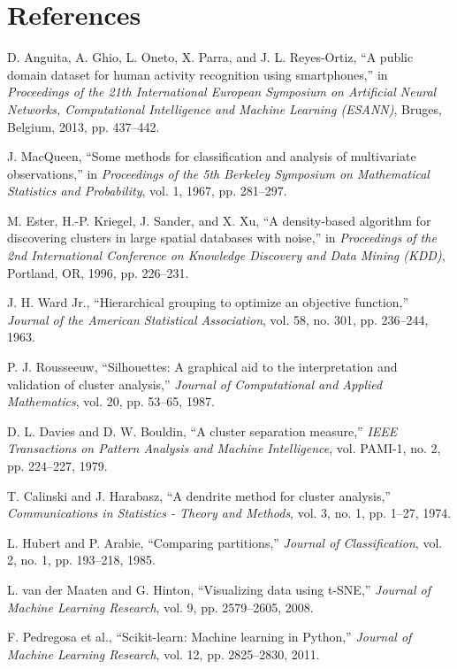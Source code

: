 \documentclass[12pt,a4paper]{article}
\begin{document}
\section{References}
\begin{enumerate}[label={[\arabic*]},noitemsep]
    \item D. Anguita, A. Ghio, L. Oneto, X. Parra, and J. L. Reyes-Ortiz, ``A public domain dataset for human activity recognition using smartphones,'' in \textit{Proceedings of the 21th International European Symposium on Artificial Neural Networks, Computational Intelligence and Machine Learning (ESANN)}, Bruges, Belgium, 2013, pp. 437--442.
    \item J. MacQueen, ``Some methods for classification and analysis of multivariate observations,'' in \textit{Proceedings of the 5th Berkeley Symposium on Mathematical Statistics and Probability}, vol. 1, 1967, pp. 281--297.
    \item M. Ester, H.-P. Kriegel, J. Sander, and X. Xu, ``A density-based algorithm for discovering clusters in large spatial databases with noise,'' in \textit{Proceedings of the 2nd International Conference on Knowledge Discovery and Data Mining (KDD)}, Portland, OR, 1996, pp. 226--231.
    \item J. H. Ward Jr., ``Hierarchical grouping to optimize an objective function,'' \textit{Journal of the American Statistical Association}, vol. 58, no. 301, pp. 236--244, 1963.
    \item P. J. Rousseeuw, ``Silhouettes: A graphical aid to the interpretation and validation of cluster analysis,'' \textit{Journal of Computational and Applied Mathematics}, vol. 20, pp. 53--65, 1987.
    \item D. L. Davies and D. W. Bouldin, ``A cluster separation measure,'' \textit{IEEE Transactions on Pattern Analysis and Machine Intelligence}, vol. PAMI-1, no. 2, pp. 224--227, 1979.
    \item T. Calinski and J. Harabasz, ``A dendrite method for cluster analysis,'' \textit{Communications in Statistics - Theory and Methods}, vol. 3, no. 1, pp. 1--27, 1974.
    \item L. Hubert and P. Arabie, ``Comparing partitions,'' \textit{Journal of Classification}, vol. 2, no. 1, pp. 193--218, 1985.
    \item L. van der Maaten and G. Hinton, ``Visualizing data using t-SNE,'' \textit{Journal of Machine Learning Research}, vol. 9, pp. 2579--2605, 2008.
    \item F. Pedregosa et al., ``Scikit-learn: Machine learning in Python,'' \textit{Journal of Machine Learning Research}, vol. 12, pp. 2825--2830, 2011.
\end{enumerate}
\end{document}
